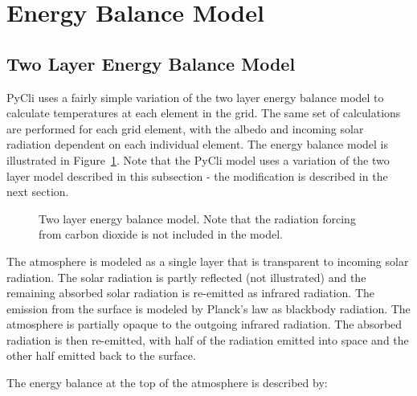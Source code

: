 \documentclass[12pt]{article} %
\begin{document}
\newpage
\section{Energy Balance Model}
\label{sec:model}

\subsection{Two Layer Energy Balance Model}

PyCli uses a fairly simple variation of the two layer energy balance model to calculate temperatures at each element in the grid. The same set of calculations are performed for each grid element, with the albedo and incoming solar radiation dependent on each individual element. The energy balance model is illustrated in Figure~\ref{fig:2layer}. Note that the PyCli model uses a variation of the two layer model described in this subsection - the modification is described in the next section.

\begin{figure}[H]
	\caption{Two layer energy balance model. Note that the radiation forcing from carbon dioxide is not included in the model.}
	\label{fig:2layer}
\end{figure}

The atmosphere is modeled as a single layer that is transparent to incoming solar radiation. The solar radiation is partly reflected (not illustrated) and the remaining absorbed solar radiation is re-emitted as infrared radiation. The emission from the surface is modeled by Planck's law as blackbody radiation. The atmosphere is partially opaque to the outgoing infrared radiation. The absorbed radiation is then re-emitted, with half of the radiation emitted into space and the other half emitted back to the surface.

The energy balance at the top of the atmosphere is described by:
\end{document}
